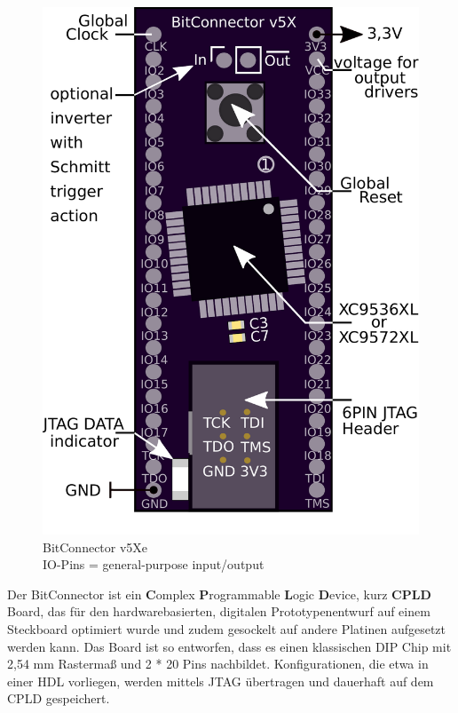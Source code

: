 \documentclass{article}
\begin{document}
\vspace{0.5cm}


\begin{figure}
		\vspace { -15pt }
	\includegraphics[scale=0.3]{BitConnector6P} 
	\caption{BitConnector v5Xe\\ IO-Pins = general-purpose input/output}
	\label{fig:}
\end{figure}

Der BitConnector ist ein \textbf{C}omplex \textbf{P}rogrammable \textbf{L}ogic \textbf{D}evice, kurz \textbf{CPLD} Board, das für den  hardwarebasierten, digitalen Prototypenentwurf auf einem Steckboard optimiert wurde und zudem gesockelt auf andere Platinen aufgesetzt werden kann. Das Board ist so entworfen, dass es einen klassischen DIP Chip mit 2,54 mm Rastermaß und 2 * 20 Pins nachbildet. Konfigurationen, die etwa in einer HDL vorliegen, werden mittels JTAG übertragen und dauerhaft auf dem CPLD gespeichert.
 
\end{document}
